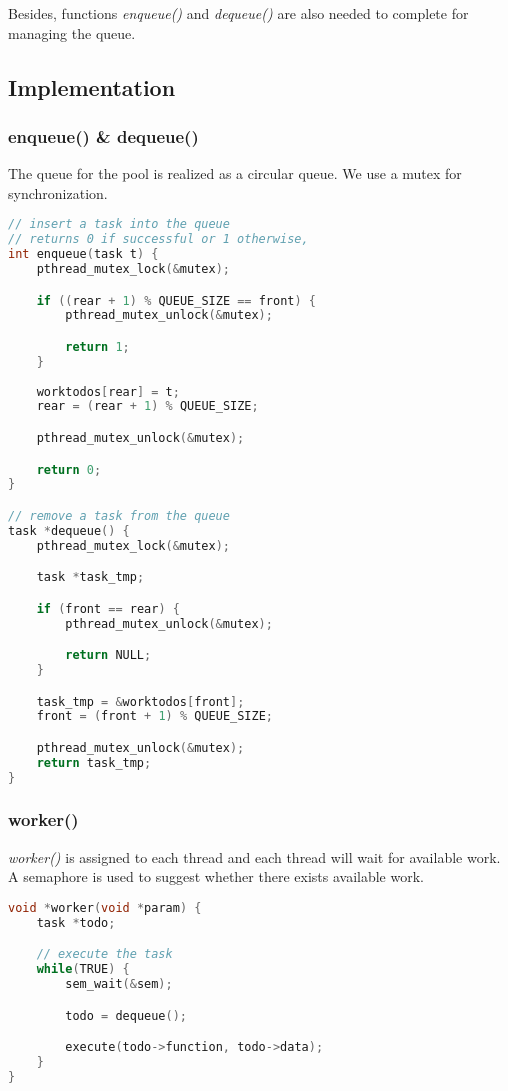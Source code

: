 \documentclass{article}
\begin{document}
Besides, functions \textit{enqueue()} and \textit{dequeue()} are also needed to complete for managing the queue. 

\subsection*{Implementation} 
\subsubsection*{enqueue() \& dequeue()}
The queue for the pool is realized as a circular queue. We use a mutex for synchronization.

\begin{lstlisting}[language=c, caption={enqueue() \& dequeue()}]
// insert a task into the queue
// returns 0 if successful or 1 otherwise, 
int enqueue(task t) {
    pthread_mutex_lock(&mutex);

    if ((rear + 1) % QUEUE_SIZE == front) {
        pthread_mutex_unlock(&mutex);

        return 1;
    }
    
    worktodos[rear] = t;
    rear = (rear + 1) % QUEUE_SIZE;

    pthread_mutex_unlock(&mutex);

    return 0; 
}

// remove a task from the queue
task *dequeue() {
    pthread_mutex_lock(&mutex);

    task *task_tmp;

    if (front == rear) {
        pthread_mutex_unlock(&mutex);

        return NULL;
    }

    task_tmp = &worktodos[front];
    front = (front + 1) % QUEUE_SIZE;

    pthread_mutex_unlock(&mutex);
    return task_tmp;
}
\end{lstlisting}

\subsubsection*{worker()} \textit{worker()} is assigned to each thread and each thread will wait for available work. A semaphore is used to suggest whether there exists available work.

\begin{lstlisting}[language=c, caption={worker()}]
void *worker(void *param) {
    task *todo;

    // execute the task
    while(TRUE) {
        sem_wait(&sem);

        todo = dequeue();

        execute(todo->function, todo->data);
    }
}
\end{lstlisting}
\end{document}
